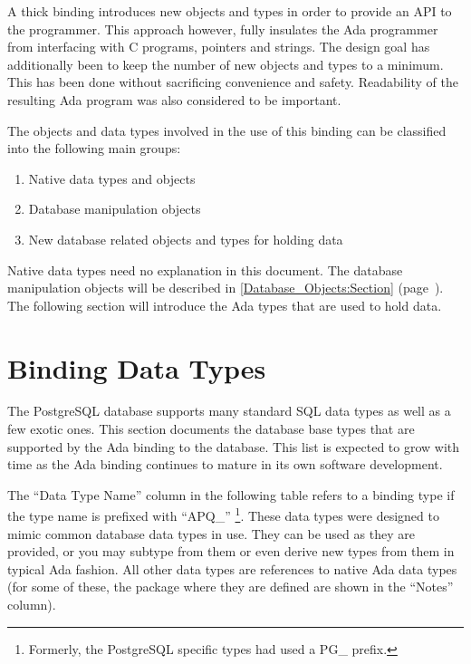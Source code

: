 \documentclass[english,letterpaper]{book}
\newcommand\Ref[1]{\textsection\ref{#1} (page~\pageref{#1})}
\begin{document}
A thick binding introduces new objects and types in order to provide
an API to the programmer. This approach however, fully insulates the
Ada programmer from interfacing with C programs, pointers and strings.
The design goal has additionally been to keep the number of new objects
and types to a minimum. This has been done without sacrificing convenience
and safety. Readability of the resulting Ada program was also considered
to be important.

The objects and data types involved in the use of this binding can
be classified into the following main groups:

\begin{enumerate}
   \item Native data types and objects
   \item Database  manipulation objects
   \item New database related objects and types for holding data
\end{enumerate}

Native data types need no explanation in this document. The database
manipulation objects will be described in 
\Ref{Database_Objects:Section}.
The following section will introduce the Ada types that are used to
hold data.


\section{Binding Data Types}

The PostgreSQL database supports many standard SQL data types as well
as a few exotic ones. This section documents the database base types
that are supported by the Ada binding to the database. This list is
expected to grow with time as the Ada binding continues to mature
in its own software development.

The ``Data Type Name'' column in the following table refers to
a binding type if the type name is prefixed with ``APQ\_''%
\footnote{Formerly, the PostgreSQL specific types had used a PG\_ prefix.%
}. These data types were designed to mimic common database data types
in use. They can be used as they are provided, or you may subtype
from them or even derive new types from them in typical Ada fashion.
All other data types are references to native Ada data types (for
some of these, the package where they are defined are shown in the
``Notes'' column).
\end{document}
